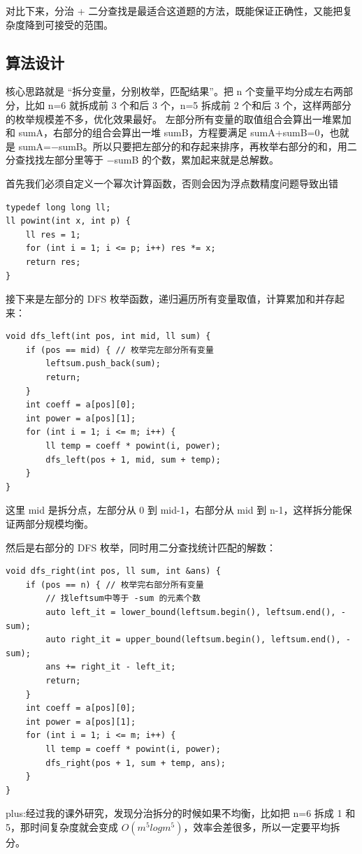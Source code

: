\documentclass[supercite]{Experimental_Report}
\theoremstyle{definition}
\begin{document}
对比下来，分治 + 二分查找是最适合这道题的方法，既能保证正确性，又能把复杂度降到可接受的范围。

\subsection{算法设计}

核心思路就是 “拆分变量，分别枚举，匹配结果”。把 n 个变量平均分成左右两部分，比如 n=6 就拆成前 3 个和后 3 个，n=5 拆成前 2 个和后 3 个，这样两部分的枚举规模差不多，优化效果最好。
左部分所有变量的取值组合会算出一堆累加和 sumA，右部分的组合会算出一堆 sumB，方程要满足 sumA+sumB=0，也就是 sumA=−sumB。所以只要把左部分的和存起来排序，再枚举右部分的和，用二分查找找左部分里等于 −sumB 的个数，累加起来就是总解数。

首先我们必须自定义一个幂次计算函数，否则会因为浮点数精度问题导致出错
\begin{lstlisting}
typedef long long ll;
ll powint(int x, int p) {
    ll res = 1;
    for (int i = 1; i <= p; i++) res *= x;
    return res;
}
\end{lstlisting}

接下来是左部分的 DFS 枚举函数，递归遍历所有变量取值，计算累加和并存起来：
\begin{lstlisting}
void dfs_left(int pos, int mid, ll sum) {
    if (pos == mid) { // 枚举完左部分所有变量
        leftsum.push_back(sum);
        return;
    }
    int coeff = a[pos][0];
    int power = a[pos][1];
    for (int i = 1; i <= m; i++) {
        ll temp = coeff * powint(i, power);
        dfs_left(pos + 1, mid, sum + temp);
    }
}
\end{lstlisting}

这里 mid 是拆分点，左部分从 0 到 mid-1，右部分从 mid 到 n-1，这样拆分能保证两部分规模均衡。

然后是右部分的 DFS 枚举，同时用二分查找统计匹配的解数：
\begin{lstlisting}
void dfs_right(int pos, ll sum, int &ans) {
    if (pos == n) { // 枚举完右部分所有变量
        // 找leftsum中等于 -sum 的元素个数
        auto left_it = lower_bound(leftsum.begin(), leftsum.end(), -sum);
        auto right_it = upper_bound(leftsum.begin(), leftsum.end(), -sum);
        ans += right_it - left_it;
        return;
    }
    int coeff = a[pos][0];
    int power = a[pos][1];
    for (int i = 1; i <= m; i++) {
        ll temp = coeff * powint(i, power);
        dfs_right(pos + 1, sum + temp, ans);
    }
}
\end{lstlisting}

plus:经过我的课外研究，发现分治拆分的时候如果不均衡，比如把 n=6 拆成 1 和 5，那时间复杂度就会变成 $O(m^5log m^5)$，效率会差很多，所以一定要平均拆分。
\end{document}
